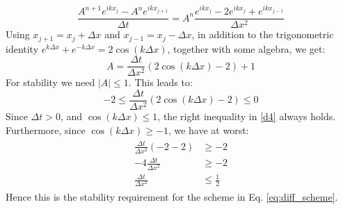 \begin{equation}
    \frac{A^{n+1}e^{i k x_j} - A^n e^{i k x_{j+1}}}{\Delta t} = A^n \frac{e^{i k x_j} - 2e^{i k x_j} + e^{i k x_{j-1}}}{\Delta x^2} 
\end{equation}
Using $x_{j+1} = x_j +\Delta x$ and $x_{j-1} = x_j -\Delta x$, in addition to the trigonometric identity $e^{k\Delta x} + e^{-k \Delta x} = 2\cos (k\Delta x)$, together with some algebra, we get:
\begin{equation}
    A = \frac{\Delta t}{\Delta x^2}(2 \cos(k \Delta x) - 2) + 1    
\end{equation}
For stability we need $|A| \leq 1$.
This leads to:
\begin{equation}\label{d4}
    -2 \leq \frac{\Delta t}{\Delta x^2}(2 \cos(k \Delta x) - 2) \leq 0
\end{equation}
Since $\Delta t > 0$, and $\cos(k \Delta x) \leq 1$, the right inequality in \ref{d4} always holds.
Furthermore, since $\cos(k \Delta x) \geq -1$, we have at worst:
\begin{align}
\begin{split}
    \frac{\Delta t}{\Delta x^2}(-2 - 2) &\geq -2 \\
    -4\frac{\Delta t}{\Delta x^2} &\geq -2 \\
    \frac{\Delta t}{\Delta x^2} &\leq \frac{1}{2}
\end{split}
\end{align}
Hence this is the stability requirement for the scheme in Eq. \ref{eq:diff_scheme}.